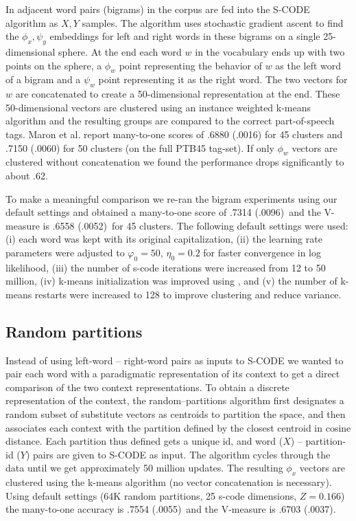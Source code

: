\documentclass[11pt]{article}
\newcommand{\bgmto}{.7314 (.0096)}
\newcommand{\bgvm}{.6558 (.0052)}
\newcommand{\rpmto}{.7554 (.0055)}
\newcommand{\rpvm}{.6703 (.0037)}
\begin{document}
In \cite{maron2010sphere} adjacent word pairs (bigrams) in the corpus
are fed into the S-CODE algorithm as $X, Y$ samples.  The algorithm
uses stochastic gradient ascent to find the $\phi_x, \psi_y$
embeddings for left and right words in these bigrams on a single
25-dimensional sphere.  At the end each word $w$ in the vocabulary
ends up with two points on the sphere, a $\phi_w$ point representing
the behavior of $w$ as the left word of a bigram and a $\psi_w$ point
representing it as the right word.  The two vectors for $w$ are
concatenated to create a 50-dimensional representation at the end.
These 50-dimensional vectors are clustered using an instance weighted
k-means algorithm and the resulting groups are compared to the correct
part-of-speech tags.  Maron et al.  report
many-to-one scores of .6880 (.0016) for 45 clusters and .7150 (.0060)
for 50 clusters (on the full PTB45 tag-set).  If only $\phi_w$ vectors
are clustered without concatenation we found the performance drops
significantly to about .62.

To make a meaningful comparison we re-ran the bigram experiments using
our default settings and obtained a many-to-one score of \bgmto\ 
and the V-measure is \bgvm\  for 45 clusters.  The following
default settings were used: (i) each word was kept with its original
capitalization, (ii) the learning rate parameters were adjusted to
$\varphi_0=50$, $\eta_0=0.2$ for faster convergence in log likelihood,
(iii) the number of s-code iterations were increased from 12 to 50
million, (iv) k-means initialization was improved using
\cite{arthur2007k}, and (v) the number of k-means restarts were
increased to 128 to improve clustering and reduce variance.

\subsection{Random partitions}\label{sec:rpart}

Instead of using left-word -- right-word pairs as inputs to S-CODE we
wanted to pair each word with a paradigmatic representation of its
context to get a direct comparison of the two context representations.
To obtain a discrete representation of the context, the
random--partitions algorithm first designates a random subset of
substitute vectors as centroids to partition the space, and then
associates each context with the partition defined by the closest
centroid in cosine distance.  Each partition thus defined gets a
unique id, and word ($X$) -- partition-id ($Y$) pairs are given to
S-CODE as input.  The algorithm cycles through the data until we get
approximately 50 million updates.  The resulting $\phi_x$ vectors are
clustered using the k-means algorithm (no vector concatenation is
necessary).  Using default settings (64K random partitions, 25 s-code
dimensions, $Z=0.166$) the many-to-one accuracy is \rpmto\ and
the V-measure is \rpvm.
\end{document}
